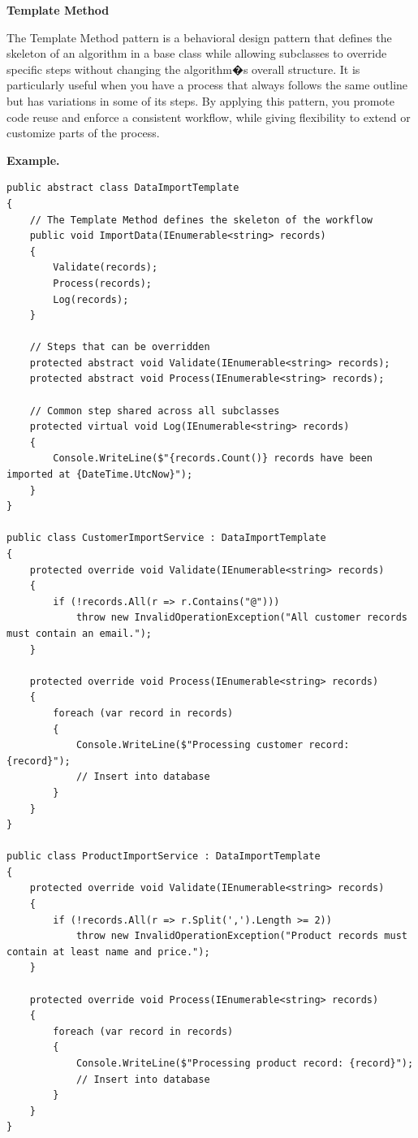 \medskip
\begin{center}
\textbf{Template Method}
\end{center}

The Template Method pattern is a behavioral design pattern that defines the skeleton of an algorithm in a base class while allowing subclasses to override specific steps without changing the algorithm�s overall structure. It is particularly useful when you have a process that always follows the same outline but has variations in some of its steps. By applying this pattern, you promote code reuse and enforce a consistent workflow, while giving flexibility to extend or customize parts of the process.

\textbf{Example.}

\begin{lstlisting}
public abstract class DataImportTemplate
{
    // The Template Method defines the skeleton of the workflow
    public void ImportData(IEnumerable<string> records)
    {
        Validate(records);
        Process(records);
        Log(records);
    }

    // Steps that can be overridden
    protected abstract void Validate(IEnumerable<string> records);
    protected abstract void Process(IEnumerable<string> records);

    // Common step shared across all subclasses
    protected virtual void Log(IEnumerable<string> records)
    {
        Console.WriteLine($"{records.Count()} records have been imported at {DateTime.UtcNow}");
    }
}

public class CustomerImportService : DataImportTemplate
{
    protected override void Validate(IEnumerable<string> records)
    {
        if (!records.All(r => r.Contains("@")))
            throw new InvalidOperationException("All customer records must contain an email.");
    }

    protected override void Process(IEnumerable<string> records)
    {
        foreach (var record in records)
        {
            Console.WriteLine($"Processing customer record: {record}");
            // Insert into database
        }
    }
}

public class ProductImportService : DataImportTemplate
{
    protected override void Validate(IEnumerable<string> records)
    {
        if (!records.All(r => r.Split(',').Length >= 2))
            throw new InvalidOperationException("Product records must contain at least name and price.");
    }

    protected override void Process(IEnumerable<string> records)
    {
        foreach (var record in records)
        {
            Console.WriteLine($"Processing product record: {record}");
            // Insert into database
        }
    }
}

\end{lstlisting}

